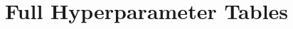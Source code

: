 \chapter{Full Hyperparameter Tables}
\label{app:hyperparameters}

\begin{table}[H]
\centering
\caption{TD3 Hyperparameters}
\label{tab:hyperparameters}
\end{table}
